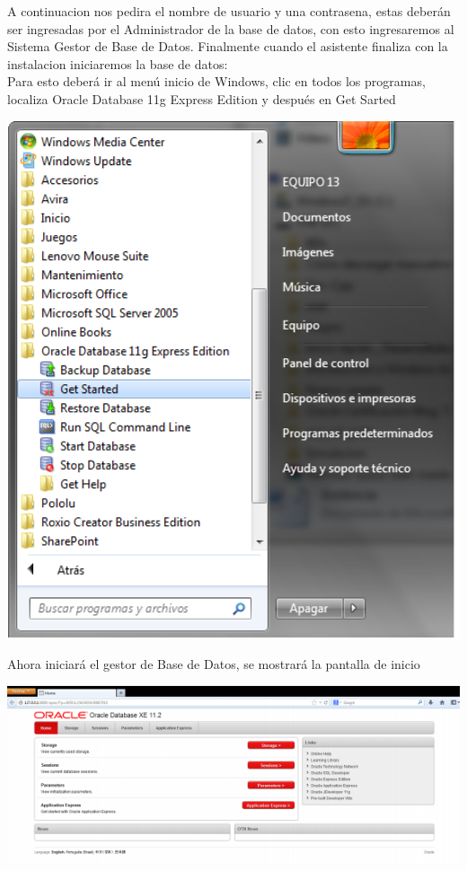 \documentclass[12pt,letterpaper]{article}
\begin{document}
A continuacion nos pedira el nombre de usuario y una contrasena, estas deberán
ser ingresadas por el Administrador de la base de datos, con esto ingresaremos al
Sistema Gestor de Base de Datos. Finalmente cuando el asistente finaliza con la
instalacion iniciaremos la base de datos:\\
Para esto deberá ir al menú inicio de Windows, clic en todos los programas,
localiza Oracle Database 11g Express Edition y después en Get Sarted
\begin{center}
\includegraphics[width=15cm]{./IMG/img4}
\end{center} 
Ahora iniciará el gestor de Base de Datos, se mostrará la pantalla de inicio
\begin{center}
\includegraphics[width=15cm]{./IMG/img5}
\end{center} 
\end{document}
